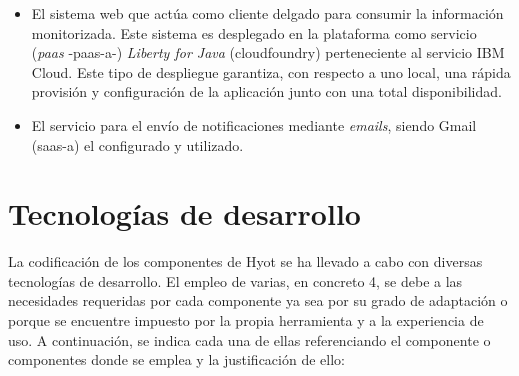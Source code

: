 \documentclass[12pt,a4paper, twoside]{report}
\begin{document}
\begin{itemize}
\begin{itemize}
			\item El sistema web que actúa como cliente delgado para consumir la información monitorizada. Este sistema es desplegado en la plataforma como servicio (\textit{\gls{paas}} -\gls{paas-a}-) \cite{gonzalez:2011:TCCS} \textit{Liberty for Java} (\gls{cloudfoundry}) perteneciente al servicio IBM Cloud. Este tipo de despliegue garantiza, con respecto a uno local, una rápida provisión y configuración de la aplicación junto con una total disponibilidad.  
		
			\item El servicio para el envío de notificaciones mediante \textit{emails}, siendo Gmail (\gls{saas-a}) el configurado y utilizado.
		\end{itemize}
	\end{itemize}
			
	\section{Tecnologías de desarrollo}
	
	La codificación de los componentes de Hyot se ha llevado a cabo con diversas tecnologías de desarrollo. El empleo de varias, en concreto 4, se debe a las necesidades requeridas por cada componente ya sea por su grado de adaptación o porque se encuentre impuesto por la propia herramienta y a la experiencia de uso. A continuación, se indica cada una de ellas referenciando el componente o componentes donde se emplea y la justificación de ello:
	
\end{document}
